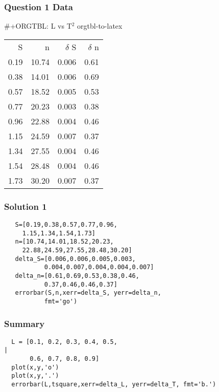 \documentclass[presentation]{beamer}
\begin{document}
\begin{frame}
\frametitle{Question 1 Data}
\label{sec-13}


  \#+ORGTBL: L vs T$^2$ orgtbl-to-latex


\begin{center}
\begin{tabular}{rrrr}
    S  &      n  &  $\delta$ S  &  $\delta$ n  \\
 0.19  &  10.74  &       0.006  &        0.61  \\
 0.38  &  14.01  &       0.006  &        0.69  \\
 0.57  &  18.52  &       0.005  &        0.53  \\
 0.77  &  20.23  &       0.003  &        0.38  \\
 0.96  &  22.88  &       0.004  &        0.46  \\
 1.15  &  24.59  &       0.007  &        0.37  \\
 1.34  &  27.55  &       0.004  &        0.46  \\
 1.54  &  28.48  &       0.004  &        0.46  \\
 1.73  &  30.20  &       0.007  &        0.37  \\
\end{tabular}
\end{center}


  
  
    
\end{frame}
\begin{frame}[fragile]
\frametitle{Solution 1}
\label{sec-14}

  
\begin{verbatim}
   S=[0.19,0.38,0.57,0.77,0.96,
     1.15,1.34,1.54,1.73]
   n=[10.74,14.01,18.52,20.23,
     22.88,24.59,27.55,28.48,30.20]
   delta_S=[0.006,0.006,0.005,0.003,
           0.004,0.007,0.004,0.004,0.007]
   delta_n=[0.61,0.69,0.53,0.38,0.46,
           0.37,0.46,0.46,0.37]
   errorbar(S,n,xerr=delta_S, yerr=delta_n, 
           fmt='go')
\end{verbatim}
\end{frame}
\begin{frame}[fragile]
\frametitle{Summary}
\label{sec-15}

\begin{verbatim}
  L = [0.1, 0.2, 0.3, 0.4, 0.5,                                             |
       0.6, 0.7, 0.8, 0.9]  
  plot(x,y,'o')
  plot(x,y,'.')
  errorbar(L,tsquare,xerr=delta_L, yerr=delta_T, fmt='b.')    
\end{verbatim}
\end{frame}
\end{document}

